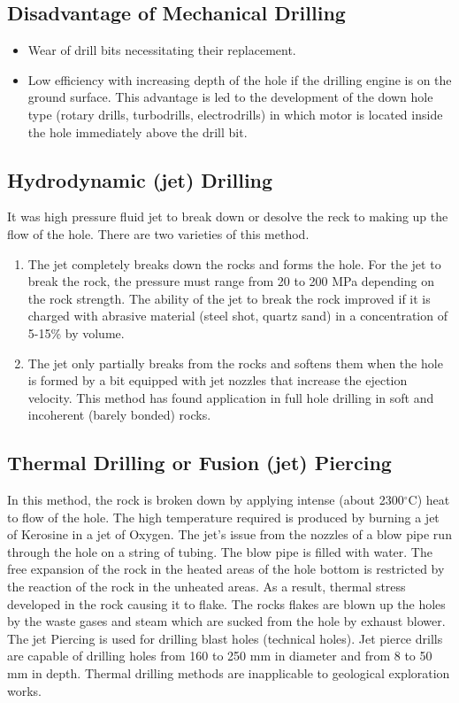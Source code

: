 \documentclass{article}
\begin{document}
\begin{multicols}{2}
  
  \subsection*{Disadvantage of Mechanical Drilling}
  \begin{itemize}
    \item Wear of drill bits necessitating their replacement.
    \item Low efficiency with increasing depth of the hole if the drilling engine is on the ground surface. This advantage is led to the development of the down hole type (rotary drills, turbodrills, electrodrills) in which motor is located inside the hole immediately above the drill bit. 
  \end{itemize}

  \subsection*{Hydrodynamic (jet) Drilling}
  It was high pressure fluid jet to break down or desolve the reck to making up the flow of the hole. There are two varieties of this method. 

  \begin{enumerate}
    \item The jet completely breaks down the rocks and forms the hole. For the jet to break the rock, the pressure must range from 20 to 200 MPa depending on the rock strength. The ability of the jet to break the rock improved if it is charged with abrasive material (steel shot, quartz sand) in a concentration of 5-15\% by volume. 
    \item The jet only partially breaks from the rocks and softens them when the hole is formed by a bit equipped with jet nozzles that increase the ejection velocity. This method has found application in full hole drilling in soft and incoherent (barely bonded) rocks. 
  \end{enumerate}

  \subsection*{Thermal Drilling or Fusion (jet) Piercing}
  In this method, the rock is broken down by applying intense (about 2300$^\circ$C) heat to flow of the hole. The high temperature required is produced by burning a jet of Kerosine in a jet of Oxygen. The jet's issue from the nozzles of a blow pipe run through the hole on a string of tubing. The blow pipe is filled with water. The free expansion of the rock in the heated areas of the hole bottom is restricted by the reaction of the rock in the unheated areas. As a result, thermal stress developed in the rock causing it to flake. The rocks flakes are blown up the holes by the waste gases and steam which are sucked from the hole by exhaust blower. The jet Piercing is used for drilling blast holes (technical holes). Jet pierce drills are capable of drilling holes from 160 to 250 mm in diameter and from 8 to 50 mm in depth. Thermal drilling methods are inapplicable to geological exploration works. 



\end{multicols}
\end{document}
